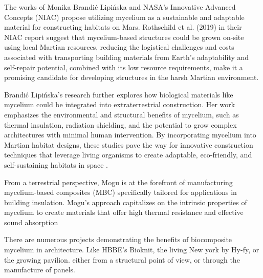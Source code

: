 The works of Monika Brandić Lipińska and NASA’s Innovative Advanced Concepts (NIAC) propose utilizing mycelium as a sustainable and adaptable material for constructing habitats on Mars. Rothschild et al. (2019) \cite{rothschild2019myco} in their NIAC report suggest that mycelium-based structures could be grown on-site using local Martian resources, reducing the logistical challenges and costs associated with transporting building materials from Earth’s adaptability and self-repair potential, combined with its low resource requirements, make it a promising candidate for developing structures in the harsh Martian environment.

Brandić Lipińska’s research\cite{brandic2022biological} further explores how biological materials like mycelium could be integrated into extraterrestrial construction. Her work emphasizes the environmental and structural benefits of mycelium, such as thermal insulation, radiation shielding, and the potential to grow complex architectures with minimal human intervention. By incorporating mycelium into Martian habitat designs, these studies pave the way for innovative construction techniques that leverage living organisms to create adaptable, eco-friendly, and self-sustaining habitats in space .

From a terrestrial perspective, Mogu\cite{MoguMogu} is at the forefront of manufacturing mycelium-based composites (MBC) specifically tailored for applications in building insulation. Mogu’s approach capitalizes on the intrinsic properties of mycelium to create materials that offer high thermal resistance and effective sound absorption

There are numerous projects demonstrating the benefits of biocomposite mycelium in architecture. Like HBBE's Bioknit, the living New york by Hy-fy, or the growing pavilion\cite{thegrowingpavilion}. either from a structural point of view, or through the manufacture of panels.  

